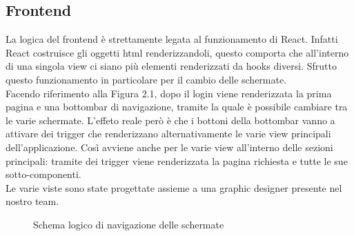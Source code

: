 \subsection{Frontend}
La logica del frontend è strettamente legata al funzionamento di React. Infatti React costruisce gli oggetti html renderizzandoli, questo comporta che all'interno di una singola view ci siano più elementi renderizzati da hooks diversi. Sfrutto questo funzionamento in particolare per il cambio delle schermate.\\
Facendo riferimento alla Figura 2.1, dopo il login viene renderizzata la prima pagina e una bottombar di navigazione, tramite la quale è possibile cambiare tra le varie schermate. L'effeto reale però è che i bottoni della bottombar vanno a attivare dei trigger che renderizzano alternativamente le varie view principali dell'applicazione. Così avviene anche per le varie view all'interno delle sezioni principali: tramite dei trigger viene renderizzata la pagina richiesta e tutte le sue sotto-componenti.\\
Le varie viste sono state progettate assieme a una graphic designer presente nel nostro team. 


\begin{figure}[!htbp]
    \centering
    \hspace*{\dimexpr(\paperwidth-\textwidth)/15}
    \caption{Schema logico di navigazione delle schermate}
    \label{Schema logico di navigazione delle schermate}
\end{figure}



